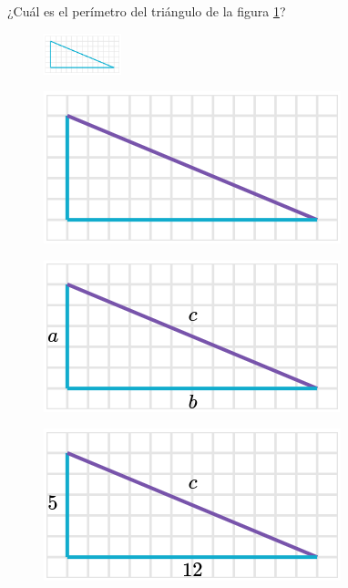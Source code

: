 
¿Cuál es el perímetro del triángulo de la figura \ref{fig:peri_rect_01}?

\begin{figure}[H]
    \centering
    \includegraphics[width=0.2\textwidth]{../images/peri_rect_01.png}
    \caption{}
    \label{fig:peri_rect_01}
\end{figure}
\begin{solutionbox}{16cm}
    \begin{minipage}{0.3\textwidth}
        \begin{figure}[H]
            \centering
            \includegraphics[width=0.6\linewidth]{../images/peri_rect_01a.png}
            \caption{}
            \label{fig:peri_rect_01a}
        \end{figure}
        \begin{figure}[H]
            \centering
            \includegraphics[width=0.6\linewidth]{../images/peri_rect_01b.png}
            \caption{}
            \label{fig:peri_rect_01b}
        \end{figure}
        \begin{figure}[H]
            \centering
            \includegraphics[width=0.6\linewidth]{../images/peri_rect_01c.png}

\end{figure}
\end{minipage}
\end{solutionbox}
